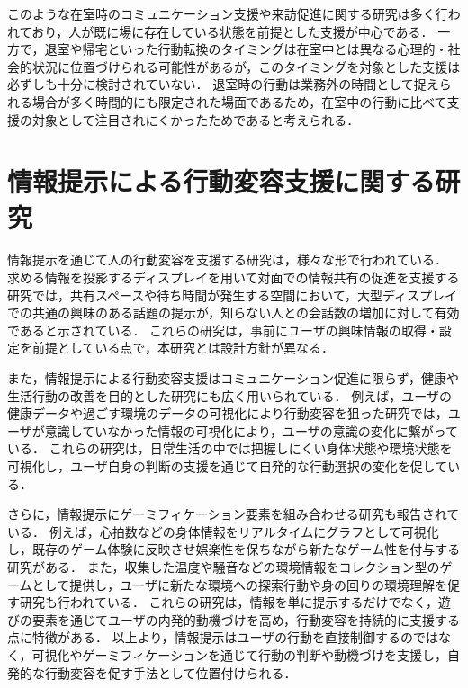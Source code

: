 このような在室時のコミュニケーション支援や来訪促進に関する研究は多く行われており，人が既に場に存在している状態を前提とした支援が中心である．
一方で，退室や帰宅といった行動転換のタイミングは在室中とは異なる心理的・社会的状況に位置づけられる可能性があるが，このタイミングを対象とした支援は必ずしも十分に検討されていない．
退室時の行動は業務外の時間として捉えられる場合が多く時間的にも限定された場面であるため，在室中の行動に比べて支援の対象として注目されにくかったためであると考えられる．



\section{情報提示による行動変容支援に関する研究}%
情報提示を通じて人の行動変容を支援する研究は，様々な形で行われている．
求める情報を投影するディスプレイを用いて対面での情報共有の促進を支援する研究\cite{huneas}\cite{concierge}では，共有スペースや待ち時間が発生する空間において，大型ディスプレイでの共通の興味のある話題の提示が，知らない人との会話数の増加に対して有効であると示されている．
これらの研究は，事前にユーザの興味情報の取得・設定を前提としている点で，本研究とは設計方針が異なる．


また，情報提示による行動変容支援はコミュニケーション促進に限らず，健康や生活行動の改善を目的とした研究にも広く用いられている．
例えば，ユーザの健康データや過ごす環境のデータの可視化により行動変容を狙った研究\cite{kenkou}\cite{kion}では，ユーザが意識していなかった情報の可視化により，ユーザの意識の変化に繋がっている．
これらの研究は，日常生活の中では把握しにくい身体状態や環境状態を可視化し，ユーザ自身の判断の支援を通じて自発的な行動選択の変化を促している．


さらに，情報提示にゲーミフィケーション要素を組み合わせる研究も報告されている．
例えば，心拍数などの身体情報をリアルタイムにグラフとして可視化し，既存のゲーム体験に反映させ娯楽性を保ちながら新たなゲーム性を付与する研究\cite{zinro}がある．
また，収集した温度や騒音などの環境情報をコレクション型のゲームとして提供し，ユーザに新たな環境への探索行動や身の回りの環境理解を促す研究\cite{kancolle}も行われている．
これらの研究は，情報を単に提示するだけでなく，遊びの要素を通じてユーザの内発的動機づけを高め，行動変容を持続的に支援する点に特徴がある．
以上より，情報提示はユーザの行動を直接制御するのではなく，可視化やゲーミフィケーションを通じて行動の判断や動機づけを支援し，自発的な行動変容を促す手法として位置付けられる．



